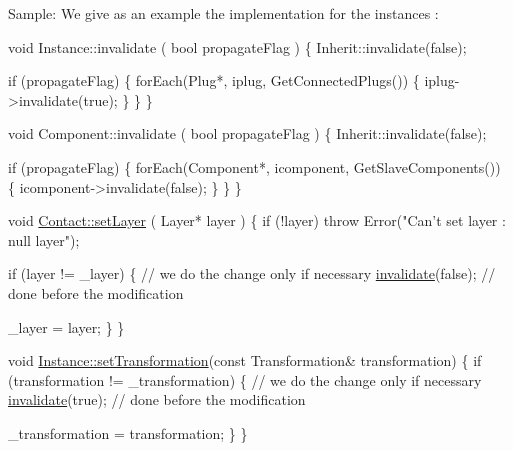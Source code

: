 \begin{DoxyParagraph}{Sample\-:}
We give as an example the implementation for the instances \-: 
\begin{DoxyCode}
\textcolor{keywordtype}{void} Instance::invalidate ( \textcolor{keywordtype}{bool} propagateFlag )
\{
  Inherit::invalidate(\textcolor{keyword}{false});
 
  \textcolor{keywordflow}{if} (propagateFlag) \{
    forEach(Plug*, iplug, GetConnectedPlugs()) \{
      iplug->invalidate(\textcolor{keyword}{true});
    \}
  \}
\}
\end{DoxyCode}
 
\begin{DoxyCode}
\textcolor{keywordtype}{void} Component::invalidate ( \textcolor{keywordtype}{bool} propagateFlag )
\{
  Inherit::invalidate(\textcolor{keyword}{false});
 
  \textcolor{keywordflow}{if} (propagateFlag) \{
    forEach(Component*, icomponent, GetSlaveComponents()) \{
      icomponent->invalidate(\textcolor{keyword}{false});
    \}
  \}
\}
\end{DoxyCode}
 
\begin{DoxyCode}
\textcolor{keywordtype}{void} \hyperlink{classHurricane_1_1Contact_a147644849f33bc4d58b6b997543c8306}{Contact::setLayer} ( Layer* layer )
\{
  \textcolor{keywordflow}{if} (!layer) \textcolor{keywordflow}{throw} Error(\textcolor{stringliteral}{"Can't set layer : null layer"});
 
  \textcolor{keywordflow}{if} (layer != \_layer) \{
    \textcolor{comment}{// we do the change only if necessary}
    \hyperlink{classHurricane_1_1Go_a5ee451e118fe8cace16989c0f3a6d855}{invalidate}(\textcolor{keyword}{false}); \textcolor{comment}{// done before the modification}
 
    \_layer = layer;
  \}
\}
\end{DoxyCode}
 
\begin{DoxyCode}
\textcolor{keywordtype}{void} \hyperlink{classHurricane_1_1Instance_a8890d2e1b2ba2542997454297e63512f}{Instance::setTransformation}(\textcolor{keyword}{const} Transformation& transformation)
\{
  \textcolor{keywordflow}{if} (transformation != \_transformation) \{
    \textcolor{comment}{// we do the change only if necessary}
    \hyperlink{classHurricane_1_1Go_a5ee451e118fe8cace16989c0f3a6d855}{invalidate}(\textcolor{keyword}{true}); \textcolor{comment}{// done before the modification}

    \_transformation = transformation;
  \}
\}
\end{DoxyCode}
 
\end{DoxyParagraph}
